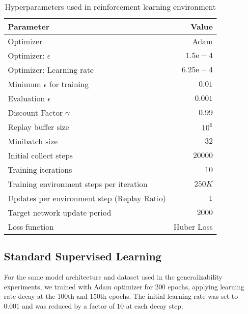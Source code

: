 \begin{table}[h]
    \centering
    \caption{Hyperparameters used in reinforcement learning environment}
    \begin{tabular}{l r}
        \toprule
        \textbf{Parameter} & \textbf{Value} \\
        \midrule
        Optimizer & Adam \cite{kingma2014adam} \\
        Optimizer: $\epsilon$ & $1.5\mathrm{e}-4$ \\
        Optimizer: Learning rate & $6.25\mathrm{e}-4$ \\
        \midrule
        Minimum $\epsilon$ for training & $0.01$ \\
        Evaluation $\epsilon$ & $0.001$\\
        Discount Factor $\gamma$ & $0.99$ \\
        Replay buffer size & $10^6$ \\
        Minibatch size & $32$ \\
        Initial collect steps & $20000$ \\
        Training iterations & $10$ \\
        Training environment steps per iteration & $250K$ \\
        Updates per environment step (Replay Ratio) & $1$ \\
        Target network update period & $2000$\\
        Loss function & Huber Loss \cite{huber1992robust} \\
        
        \bottomrule
    \end{tabular}
    \label{tab:hyperparameter_rl_env}
\end{table}







\subsection{Standard Supervised Learning}
For the same model architecture and dataset used in the generalizability experiments, we trained with Adam optimizer for 200 epochs, applying learning rate decay at the 100th and 150th epochs. The initial learning rate was set to $0.001$ and was reduced by a factor of $10$ at each decay step.



